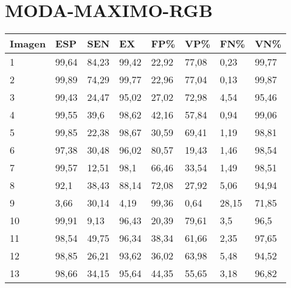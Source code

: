 \section{MODA-MAXIMO-RGB}
\begin{longtable}[c]{|l|l|l|l|l|l|l|l|}
\hline
\textbf{Imagen} & \textbf{ESP} & \textbf{SEN} & \textbf{EX} & \textbf{FP\%} & \textbf{VP\%} & \textbf{FN\%} & \textbf{VN\%} \\ \hline
\endfirsthead
%
\endhead
%
1               & 99,64        & 84,23        & 99,42       & 22,92         & 77,08         & 0,23          & 99,77         \\ \hline
2               & 99,89        & 74,29        & 99,77       & 22,96         & 77,04         & 0,13          & 99,87         \\ \hline
3               & 99,43        & 24,47        & 95,02       & 27,02         & 72,98         & 4,54          & 95,46         \\ \hline
4               & 99,55        & 39,6         & 98,62       & 42,16         & 57,84         & 0,94          & 99,06         \\ \hline
5               & 99,85        & 22,38        & 98,67       & 30,59         & 69,41         & 1,19          & 98,81         \\ \hline
6               & 97,38        & 30,48        & 96,02       & 80,57         & 19,43         & 1,46          & 98,54         \\ \hline
7               & 99,57        & 12,51        & 98,1        & 66,46         & 33,54         & 1,49          & 98,51         \\ \hline
8               & 92,1         & 38,43        & 88,14       & 72,08         & 27,92         & 5,06          & 94,94         \\ \hline
9               & 3,66         & 30,14        & 4,19        & 99,36         & 0,64          & 28,15         & 71,85         \\ \hline
10              & 99,91        & 9,13         & 96,43       & 20,39         & 79,61         & 3,5           & 96,5          \\ \hline
11              & 98,54        & 49,75        & 96,34       & 38,34         & 61,66         & 2,35          & 97,65         \\ \hline
12              & 98,85        & 26,21        & 93,62       & 36,02         & 63,98         & 5,48          & 94,52         \\ \hline
13              & 98,66        & 34,15        & 95,64       & 44,35         & 55,65         & 3,18          & 96,82         \\ \hline

\end{longtable}
